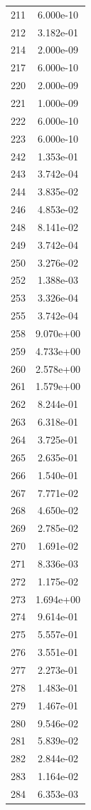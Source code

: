 \documentclass[12pt]{article}
\begin{document}
\begin{longtable}{@{}cc@{}}
211 & 6.000e-10 \\
212 & 3.182e-01 \\
214 & 2.000e-09 \\
217 & 6.000e-10 \\
220 & 2.000e-09 \\
221 & 1.000e-09 \\
222 & 6.000e-10 \\
223 & 6.000e-10 \\
242 & 1.353e-01 \\
243 & 3.742e-04 \\
244 & 3.835e-02 \\
246 & 4.853e-02 \\
248 & 8.141e-02 \\
249 & 3.742e-04 \\
250 & 3.276e-02 \\
252 & 1.388e-03 \\
253 & 3.326e-04 \\
255 & 3.742e-04 \\
258 & 9.070e+00 \\
259 & 4.733e+00 \\
260 & 2.578e+00 \\
261 & 1.579e+00 \\
262 & 8.244e-01 \\
263 & 6.318e-01 \\
264 & 3.725e-01 \\
265 & 2.635e-01 \\
266 & 1.540e-01 \\
267 & 7.771e-02 \\
268 & 4.650e-02 \\
269 & 2.785e-02 \\
270 & 1.691e-02 \\
271 & 8.336e-03 \\
272 & 1.175e-02 \\
273 & 1.694e+00 \\
274 & 9.614e-01 \\
275 & 5.557e-01 \\
276 & 3.551e-01 \\
277 & 2.273e-01 \\
278 & 1.483e-01 \\
279 & 1.467e-01 \\
280 & 9.546e-02 \\
281 & 5.839e-02 \\
282 & 2.844e-02 \\
283 & 1.164e-02 \\
284 & 6.353e-03 \\

\end{longtable}
\end{document}
